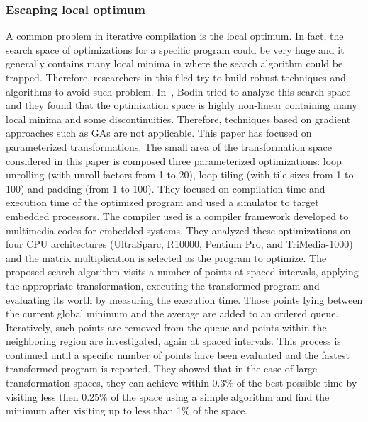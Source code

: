 
\subsubsection{Escaping local optimum}


A common problem in iterative compilation is the local optimum. In fact, the search space of optimizations for a specific program could be very huge and it generally contains many local minima in where the search algorithm could be trapped\cite{bodin1998iterative}. Therefore, researchers in this filed try to build robust techniques and algorithms to avoid such problem.
In~\cite{bodin1998iterative}, Bodin \etal tried to analyze this search space and they found that the optimization space is highly non-linear containing many local minima and some discontinuities. Therefore, techniques based on gradient approaches such as GAs are not applicable.
This paper has focused on parameterized transformations. The small area of the transformation space considered in this paper is composed  three parameterized optimizations: loop unrolling (with unroll factors from 1 to 20), loop tiling (with tile sizes from 1 to 100) and padding (from 1 to 100). They focused on compilation time and execution time of the optimized program and used a simulator to target embedded processors. The compiler used is a compiler framework developed to  multimedia codes for embedded systems.
They analyzed these optimizations on four CPU architectures (UltraSparc, R10000, Pentium Pro, and TriMedia-1000) and the matrix multiplication is selected as the program to optimize.
The proposed search algorithm visits a number of points at spaced intervals, applying the appropriate transformation, executing
the transformed program and evaluating its worth by measuring the execution time. Those points lying between
the current global minimum and the average are added to an ordered queue. Iteratively, such points are removed from the queue and points within the neighboring region are investigated, again at spaced intervals. This process is continued until a specific number of points have been evaluated and the fastest transformed program is reported.
They showed that in the case of large transformation spaces, they can achieve within 0.3\% of the best possible time by visiting less then 0.25\% of the space using a simple algorithm and find the minimum after visiting up to less than 1\% of the space.

